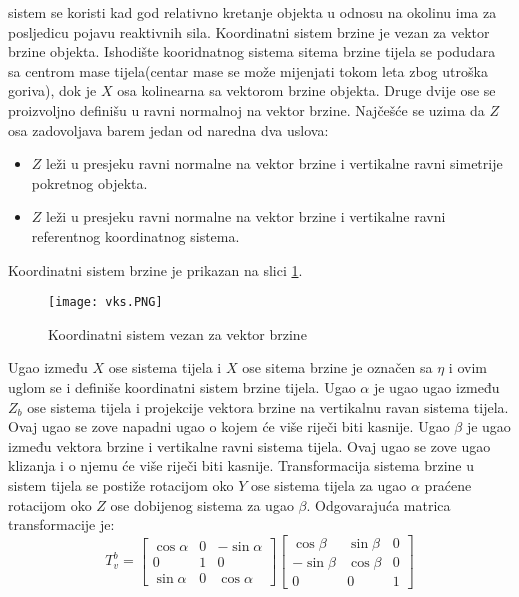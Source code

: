 sistem se koristi kad god relativno kretanje objekta u odnosu na okolinu ima za posljedicu pojavu 
reaktivnih sila. Koordinatni sistem brzine je vezan za vektor brzine objekta. Ishodište kooridnatnog sistema 
sitema brzine tijela se podudara sa centrom mase tijela(centar mase se može mijenjati tokom leta zbog utroška goriva), dok 
je $X$ osa kolinearna sa vektorom brzine objekta. Druge dvije ose se proizvoljno definišu u ravni 
normalnoj na vektor brzine. Najčešće se uzima da $Z$ osa zadovoljava barem jedan od naredna dva uslova:
\begin{itemize}
    \item $Z$ leži u presjeku ravni normalne na vektor brzine i vertikalne ravni simetrije pokretnog objekta.
    \item $Z$ leži u presjeku ravni normalne na vektor brzine i vertikalne ravni referentnog koordinatnog sistema.
\end{itemize}
Koordinatni sistem brzine je prikazan na slici \ref{fig:vks}.
\begin{figure}[!ht]
    \centering
    \texttt{[image: vks.PNG]}
    \caption{Koordinatni sistem vezan za vektor brzine}
    \label{fig:vks}
\end{figure}
Ugao između $X$ ose sistema tijela i $X$ ose sitema brzine je označen sa $\eta$ i ovim uglom se i definiše 
koordinatni sistem brzine tijela. Ugao $\alpha$ je ugao ugao između $Z_b$ ose  sistema tijela i projekcije 
vektora brzine na vertikalnu ravan sistema tijela. Ovaj ugao se zove napadni ugao o kojem će više riječi biti kasnije. 
Ugao $\beta$ je ugao između vektora brzine i vertikalne ravni sistema tijela. Ovaj ugao se zove ugao klizanja i o njemu će 
više riječi biti kasnije. Transformacija sistema brzine u sistem tijela se postiže rotacijom 
oko $Y$ ose sistema tijela za ugao $\alpha$ praćene rotacijom oko $Z$ ose dobijenog sistema za ugao $\beta$. 
Odgovarajuća matrica transformacije je:
\begin{equation}
    T_{v}^b = \begin{bmatrix}
        \cos\alpha & 0 & -\sin\alpha \\
        0& 1& 0\\
        \sin\alpha & 0 & \cos\alpha
    \end{bmatrix}
    \begin{bmatrix}
        \cos\beta & \sin\beta & 0\\
        -\sin\beta & \cos\beta & 0\\
        0 & 0& 1
    \end{bmatrix}
\end{equation}
